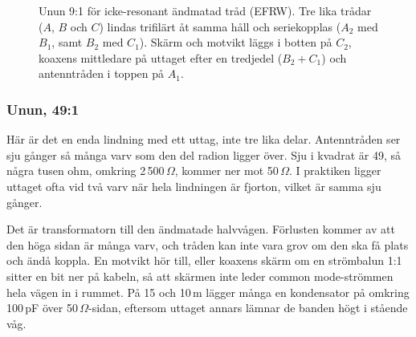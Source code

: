 \begin{figure}[H]
    \caption{Unun 9:1 för icke-resonant ändmatad tråd (EFRW). Tre lika trådar
    ($A$, $B$ och $C$) lindas trifilärt åt samma håll och seriekopplas ($A_2$ med
    $B_1$, samt $B_2$ med $C_1$). Skärm och motvikt läggs i botten på $C_2$,
    koaxens mittledare på uttaget efter en tredjedel ($B_2{+}C_1$) och
    antenntråden i toppen på $A_1$.}
    \label{fig:unun-91}
    \end{figure}


\subsubsection{Unun, 49:1}
\label{sec:unun-491}

Här är det en enda lindning med ett uttag, inte tre lika delar.
Antenntråden ser sju gånger så många varv som den del radion ligger
över. Sju i kvadrat är 49, så några tusen ohm, omkring 2\,500\,$\Omega$,
kommer ner mot 50\,$\Omega$. I praktiken ligger uttaget ofta vid två
varv när hela lindningen är fjorton, vilket är samma sju gånger.

Det är transformatorn till den ändmatade halvvågen. Förlusten kommer
av att den höga sidan är många varv, och tråden kan inte vara grov om
den ska få plats och ändå koppla. En motvikt hör till, eller koaxens
skärm om en strömbalun 1:1 sitter en bit ner på kabeln, så att skärmen
inte leder common mode-strömmen hela vägen in i rummet. På 15 och
10\,m lägger många en kondensator på omkring 100\,pF över
50\,$\Omega$-sidan, eftersom uttaget annars lämnar de banden högt i
stående våg.

